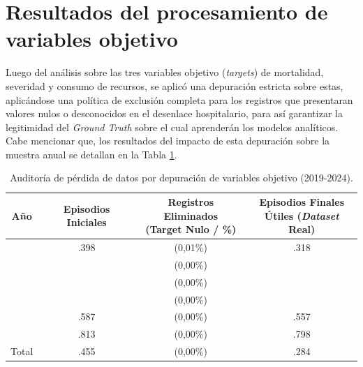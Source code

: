 \section{Resultados del procesamiento de variables objetivo}

Luego del análisis sobre las tres variables objetivo (\textit{targets}) de mortalidad, severidad y consumo de recursos, se aplicó una depuración estricta sobre estas, aplicándose una política de exclusión completa para los registros que presentaran valores nulos o desconocidos en el desenlace hospitalario, para así garantizar la legitimidad del \textit{Ground Truth} sobre el cual aprenderán los modelos analíticos. Cabe mencionar que, los resultados del impacto de esta depuración sobre la muestra anual se detallan en la Tabla \ref{tab:auditoria_depuracion_targets}.

\begin{table}[htbp]
\centering
\scriptsize
\setlength{\tabcolsep}{4pt}
\renewcommand{\arraystretch}{1.2}
\caption{Auditoría de pérdida de datos por depuración de variables objetivo (2019-2024).}
\label{tab:auditoria_depuracion_targets}
\begin{tabular}{|c|c|c|c|}
\hline
\parbox[t]{1.5cm}{\centering\textbf{Año}} & 
\parbox[t]{3.0cm}{\centering\textbf{Episodios Iniciales}} & 
\parbox[t]{3.5cm}{\centering\textbf{Registros Eliminados\\(Target Nulo / \%)}} & 
\parbox[t]{3.0cm}{\centering\textbf{Episodios Finales\\Útiles (\textit{Dataset} Real)}} \\ \hline

\parbox[t]{1.5cm}{} & \parbox[t]{3.0cm}{.398} & \parbox[t]{3.5cm}{ (0,01\%)} & \parbox[t]{3.0cm}{.318} \\ \hline
\parbox[t]{1.5cm}{} & \parbox[t]{3.0cm}{} & \parbox[t]{3.5cm}{ (0,00\%)} & \parbox[t]{3.0cm}{} \\ \hline
\parbox[t]{1.5cm}{} & \parbox[t]{3.0cm}{} & \parbox[t]{3.5cm}{ (0,00\%)} & \parbox[t]{3.0cm}{} \\ \hline
\parbox[t]{1.5cm}{} & \parbox[t]{3.0cm}{} & \parbox[t]{3.5cm}{ (0,00\%)} & \parbox[t]{3.0cm}{} \\ \hline
\parbox[t]{1.5cm}{} & \parbox[t]{3.0cm}{.587} & \parbox[t]{3.5cm}{ (0,00\%)} & \parbox[t]{3.0cm}{.557} \\ \hline
\parbox[t]{1.5cm}{} & \parbox[t]{3.0cm}{.813} & \parbox[t]{3.5cm}{ (0,00\%)} & \parbox[t]{3.0cm}{.798} \\ \hline

\parbox[t]{1.5cm}{\centering Total} & \parbox[t]{3.0cm}{.455} & \parbox[t]{3.5cm}{ (0,00\%)} & \parbox[t]{3.0cm}{.284} \\ \hline
\end{tabular}
\end{table}

